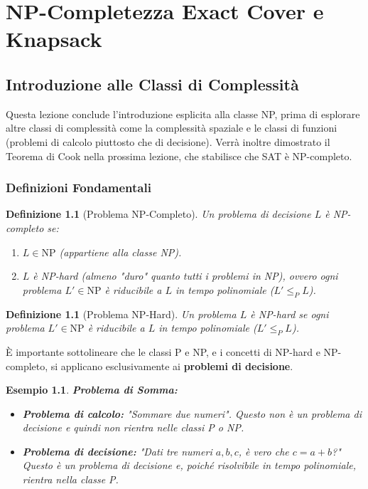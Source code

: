 \documentclass[a4paper, 11pt]{book} %
\newtheorem{definition}[theorem]{Definizione}
\newtheorem{example}[theorem]{Esempio}
\theoremstyle{definition}
\begin{document}
\chapter{NP-Completezza Exact Cover e Knapsack}



\section{Introduzione alle Classi di Complessità}

Questa lezione conclude l'introduzione esplicita alla classe NP, prima di esplorare altre classi di complessità come la complessità spaziale e le classi di funzioni (problemi di calcolo piuttosto che di decisione). Verrà inoltre dimostrato il Teorema di Cook nella prossima lezione, che stabilisce che SAT è NP-completo.

\subsection{Definizioni Fondamentali}

\begin{definition}[Problema NP-Completo]
Un problema di decisione $L$ è NP-completo se:
\begin{enumerate}
    \item $L \in \text{NP}$ (appartiene alla classe NP).
    \item $L$ è NP-hard (almeno "duro" quanto tutti i problemi in NP), ovvero ogni problema $L' \in \text{NP}$ è riducibile a $L$ in tempo polinomiale ($L' \le_P L$).
\end{enumerate}
\end{definition}

\begin{definition}[Problema NP-Hard]
Un problema $L$ è NP-hard se ogni problema $L' \in \text{NP}$ è riducibile a $L$ in tempo polinomiale ($L' \le_P L$).
\end{definition}

È importante sottolineare che le classi P e NP, e i concetti di NP-hard e NP-completo, si applicano esclusivamente ai \textbf{problemi di decisione}.

\begin{example}
\textbf{Problema di Somma:}
\begin{itemize}
    \item \textbf{Problema di calcolo:} "Sommare due numeri". Questo non è un problema di decisione e quindi non rientra nelle classi P o NP.
    \item \textbf{Problema di decisione:} "Dati tre numeri $a, b, c$, è vero che $c = a+b$?" Questo è un problema di decisione e, poiché risolvibile in tempo polinomiale, rientra nella classe P.
\end{itemize}
\end{example}
\end{document}
